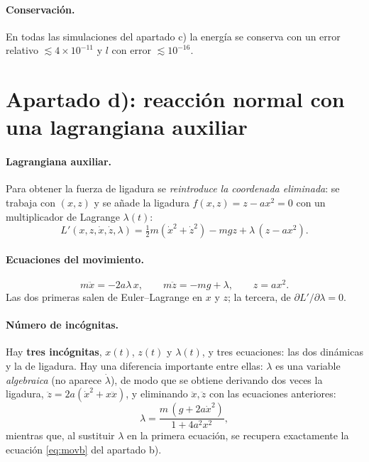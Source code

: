 \documentclass[11pt,a4paper]{article}
\begin{document}
\paragraph{Conservación.} En todas las simulaciones del apartado c) la energía se conserva con un error relativo $\lesssim4\times10^{-11}$ y $l$ con error $\lesssim10^{-16}$.

\section{Apartado d): reacción normal con una lagrangiana auxiliar}\label{sec:d}
\paragraph{Lagrangiana auxiliar.} Para obtener la fuerza de ligadura se \emph{reintroduce la coordenada eliminada}: se trabaja con $(x,z)$ y se añade la ligadura
$f(x,z)=z-ax^2=0$ con un multiplicador de Lagrange $\lambda(t)$:
\begin{equation}
 L'(x,z,\dot x,\dot z,\lambda)=\tfrac12m(\dot x^2+\dot z^2)-mgz+\lambda\,(z-ax^2).
\end{equation}

\paragraph{Ecuaciones del movimiento.}
\begin{equation}\label{eq:aux}
 m\ddot x=-2a\lambda\,x,\qquad m\ddot z=-mg+\lambda,\qquad z=ax^2 .
\end{equation}
Las dos primeras salen de Euler--Lagrange en $x$ y $z$; la tercera, de $\partial L'/\partial\lambda=0$.

\paragraph{Número de incógnitas.} Hay \textbf{tres incógnitas}, $x(t)$, $z(t)$ y $\lambda(t)$, y tres ecuaciones: las dos dinámicas y la de ligadura. Hay una diferencia importante entre ellas:
$\lambda$ es una variable \emph{algebraica} (no aparece $\dot\lambda$), de modo que se obtiene derivando dos veces la ligadura, $\ddot z=2a(\dot x^2+x\ddot x)$,
y eliminando $\ddot x,\ddot z$ con las ecuaciones anteriores:
\begin{equation}\label{eq:lambda}
 \lambda=\frac{m\,(g+2a\dot x^2)}{1+4a^2x^2},
\end{equation}
mientras que, al sustituir $\lambda$ en la primera ecuación, se recupera exactamente la ecuación \eqref{eq:movb} del apartado b).
\end{document}

